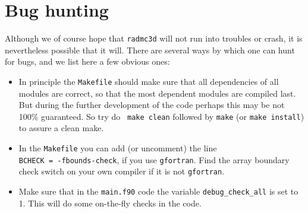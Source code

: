 \documentclass{report}
\begin{document}
\section{Bug hunting}
Although we of course hope that {\small\tt radmc3d} will not run into
troubles or crash, it is nevertheless possible that it will. There are
several ways by which one can hunt for bugs, and we list here a few 
obvious ones:
\begin{itemize}
\item In principle the {\small\tt Makefile} should make sure that all
dependencies of all modules are correct, so that the most dependent
modules are compiled last. But during the further development of the
code perhaps this may be not 100\% guaranteed. So try do {\small\tt 
make clean} followed by {\small\tt make} (or {\small\tt make install})
to assure a clean make.
\item In the {\small\tt Makefile} you can add (or uncomment) the line \\
{\small\tt BCHECK   = -fbounds-check}, if you use {\small\tt gfortran}.
Find the array boundary check switch on your own compiler if it is 
not {\small\tt gfortran}.
\item Make sure that in the {\small\tt main.f90} code the variable
{\small\tt debug\_check\_all} is set to 1. This will do some on-the-fly
checks in the code.
\end{itemize}
\end{document}
